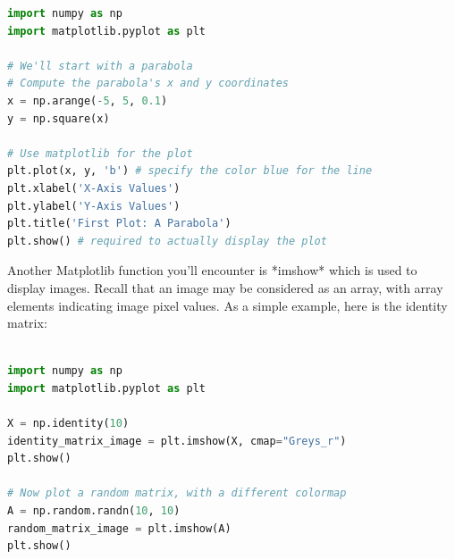 \documentclass[11pt, a4paper]{article}
\begin{document}
\begin{lstlisting}[language=Python, caption=MatPlotLib.PyPlot]
import numpy as np
import matplotlib.pyplot as plt

# We'll start with a parabola
# Compute the parabola's x and y coordinates
x = np.arange(-5, 5, 0.1)
y = np.square(x)

# Use matplotlib for the plot
plt.plot(x, y, 'b') # specify the color blue for the line
plt.xlabel('X-Axis Values')
plt.ylabel('Y-Axis Values')
plt.title('First Plot: A Parabola')
plt.show() # required to actually display the plot
\end{lstlisting}

Another Matplotlib function you'll encounter is *imshow* which is used to display images. Recall that an image may be considered as an array, with array elements indicating image pixel values. As a simple example, here is the identity matrix:


\begin{lstlisting}[language=Python]

import numpy as np
import matplotlib.pyplot as plt

X = np.identity(10)
identity_matrix_image = plt.imshow(X, cmap="Greys_r")
plt.show()

# Now plot a random matrix, with a different colormap
A = np.random.randn(10, 10)
random_matrix_image = plt.imshow(A)
plt.show()
\end{lstlisting}
\end{document}

